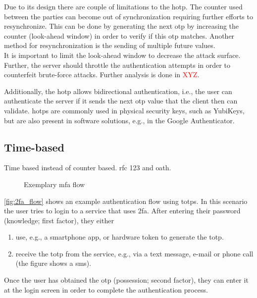 Due to its design there are couple of limitations to the \gls{hotp}. The counter used between the parties can become out of synchronization requiring further efforts to resynchronize. This can be done by generating the next \gls{otp} by increasing the counter (look-ahead window) in order to verify if this \gls{otp} matches. Another method for resynchronization is the sending of multiple future values.\\
It is important to limit the look-ahead window to decrease the attack surface. Further, the server should throttle the authentication attempts in order to counterfeit brute-force attacks. Further analysis is done in \textcolor{red}{XYZ}.

Additionally, the \gls{hotp} allows bidirectional authentication, i.e., the user can authenticate the server if it sends the next \gls{otp} value that the client then can validate. \Glspl{hotp} are commonly used in physical security keys, such as YubiKeys, but are also present in software solutions, e.g., in the Google Authenticator.

\subsection{Time-based}
\label{subsec:totp}

Time based instead of counter based. \gls{rfc} 123 and \gls{oath}.
\cite{m2011rfc}

\begin{figure}[hbt]
	\centering
	
	\caption[Exemplary \gls{mfa} flow]{Exemplary \gls{mfa} flow\footnotemark}
	\label{fig:2fa_flow}
\end{figure}

\autoref{fig:2fa_flow} shows an example authentication flow using \glspl{totp}. In this scenario the user tries to login to a service that uses \gls{2fa}. After entering their password (knowledge; first factor), they either

\begin{enumerate}[label=(\alph*)]
	\item use, e.g., a smartphone app, or hardware token to generate the \gls{totp}.
	\item receive the \gls{totp} from the service, e.g., via a text message, e-mail or phone call (the figure shows a \gls{sms}).
\end{enumerate}

Once the user has obtained the \gls{otp} (possession; second factor), they can enter it at the login screen in order to complete the authentication process.

